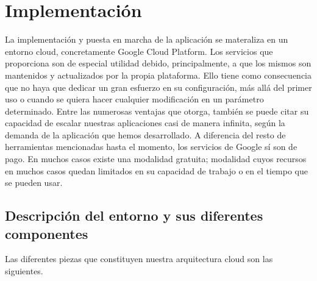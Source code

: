 \cleardoublepage
\mbox{}

\lstset{
language=Python,
basicstyle=\small\sffamily,
numbers=left,
numberstyle=\tiny,
frame=tb,
columns=fullflexible,
showstringspaces=false
}
\chapter{Implementación}
\label{ch:chapter4}
La implementación y puesta en marcha de la aplicación se materaliza en un entorno cloud, concretamente Google Cloud Platform.
Los servicios que proporciona son de especial utilidad debido, principalmente, a que los mismos son mantenidos y actualizados por la propia plataforma.
Ello tiene como consecuencia que no haya que dedicar un gran esfuerzo en su configuración, más allá del primer uso o cuando se quiera hacer cualquier modificación en un parámetro determinado.
Entre las numerosas ventajas que otorga, también se puede citar su capacidad de escalar nuestras aplicaciones casi de manera infinita, según la demanda de la aplicación que hemos desarrollado.
A diferencia del resto de herramientas mencionadas hasta el momento, los servicios de Google sí son de pago.
En muchos casos existe una modalidad gratuita;
modalidad cuyos recursos en muchos casos quedan limitados en su capacidad de trabajo o en el tiempo que se pueden usar.
\section{Descripción del entorno y sus diferentes componentes}\label{sec:descripción-del-entorno-y-sus-diferentes-componentes}
Las diferentes piezas que constituyen nuestra arquitectura cloud son las siguientes.


